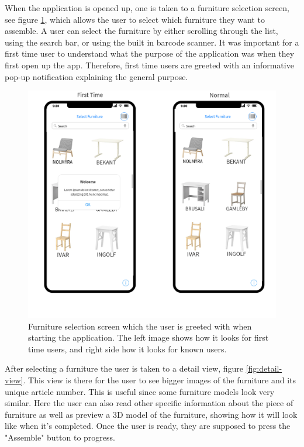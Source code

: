 When the application is opened up, one is taken to a furniture selection screen, see figure \ref{fig:furniture-select}, which allows the user to select which furniture they want to assemble. A user can select the furniture by either scrolling through the list, using the search bar, or using the built in barcode scanner. It was important for a first time user to understand what the purpose of the application was when they first open up the app. Therefore, first time users are greeted with an informative pop-up notification explaining the general purpose.

\begin{figure}[hbtp]
\begin{center}
\includegraphics[height = 0.4\textheight]{./Images/Furniture_Select.png}
\caption{Furniture selection screen which the user is greeted with when starting the application. The left image shows how it looks for first time users, and right side how it looks for known users.}
\label{fig:furniture-select}
\end{center}
\end{figure}

After selecting a furniture the user is taken to a detail view, figure \ref{fig:detail-view}. This view is there for the user to see bigger images of the furniture and its unique article number. This is useful since some furniture models look very similar. Here the user can also read other specific information about the piece of furniture as well as preview a 3D model of the furniture, showing how it will look like when it's completed. Once the user is ready, they are supposed to press the "Assemble" button to progress.
 
